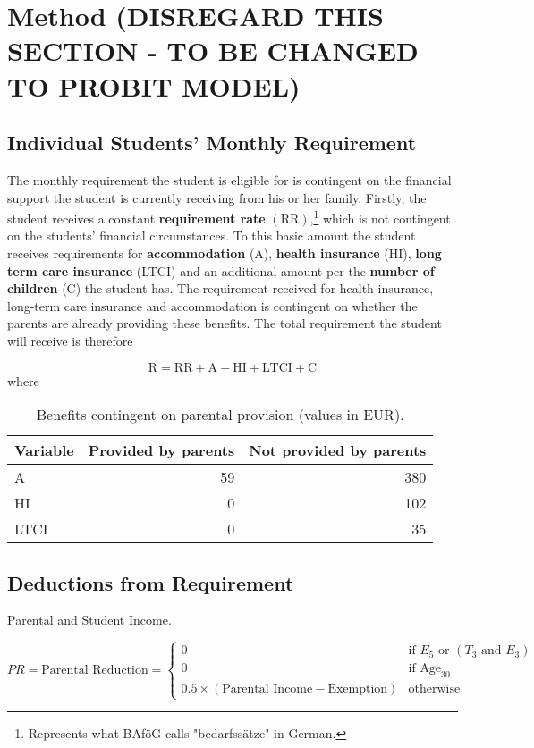 \section{Method (DISREGARD THIS SECTION - TO BE CHANGED TO PROBIT MODEL)} 


\subsection{Individual Students' Monthly Requirement}
The monthly requirement the student is eligible for is contingent on the financial support 
the student is currently receiving from his or her family. 
Firstly, the student receives a constant \textbf{requirement rate} \( (\text{RR})  \),\footnote{Represents what BAföG calls "bedarfssätze" in German.} which is not contingent on the students' financial 
circumstances. To this basic amount the student receives requirements for \textbf{accommodation} (A), 
\textbf{health insurance} (HI), \textbf{long term care insurance} (LTCI) and an additional amount per the 
\textbf{number of children} (C) the student has. 
The requirement received for health insurance, long-term care insurance and accommodation is contingent on 
whether the parents are already providing these benefits. 
The total requirement the student will receive is therefore 

\begin{equation} \label{eq:total-requirement}
  \text{R} = \text{RR}  + \text{A} + \text{HI} + \text{LTCI} + \text{C}
\end{equation}
where
\begin{table}[H]
\small
\centering
  \begin{tabular}{lrr}
  \hline
  Variable & Provided by parents & Not provided by parents \\
  \hline
  A & 59 & 380 \\
  HI & 0 & 102 \\
  LTCI & 0 & 35 \\
  \hline
  \end{tabular}
\caption{Benefits contingent on parental provision (values in EUR).}
\end{table}



\subsection{Deductions from Requirement}
Parental and Student Income.

\begin{equation} \label{eq:parental-reduction}
  PR = \text{Parental Reduction} = 
  \begin{cases}
    0 & \text{if } E_5 \text{ or } (T_3 \text{ and } E_3) \\
    0 & \text{if } \text{Age}_{30} \\
    0.5 \times (\text{Parental Income} - \text{Exemption}) & \text{otherwise}
  \end{cases}
\end{equation}

